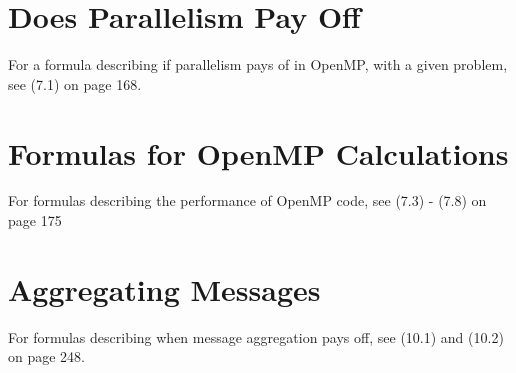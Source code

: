 \documentclass{article}
\begin{document}
	\section{Does Parallelism Pay Off}
		For a formula describing if parallelism pays of in OpenMP, with a given problem, see (7.1) on page 168.
	
	\section{Formulas for OpenMP Calculations}
		For formulas describing the performance of OpenMP code, see (7.3) - (7.8) on page 175
	
	\section{Aggregating Messages}
		For formulas describing when message aggregation pays off, see (10.1) and (10.2) on page 248.
\end{document}
